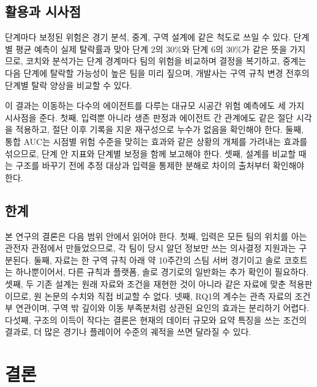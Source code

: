 \subsection{활용과 시사점}
\label{sec:discussion:implications}

단계마다 보정된 위험은 경기 분석, 중계, 구역 설계에 같은 척도로 쓰일 수 있다.
단계별 평균 예측이 실제 탈락률과 맞아 단계 2의 30\%와 단계 6의 30\%가 같은 뜻을 가지므로, 코치와 분석가는 단계 경계마다 팀의 위험을 비교하며 결정을 복기하고, 중계는 다음 단계에 탈락할 가능성이 높은 팀을 미리 짚으며, 개발사는 구역 규칙 변경 전후의 단계별 탈락 양상을 비교할 수 있다.

이 결과는 이동하는 다수의 에이전트를 다루는 대규모 시공간 위험 예측에도 세 가지 시사점을 준다.
첫째, 입력뿐 아니라 생존 판정과 에이전트 간 관계에도 같은 절단 시각을 적용하고, 절단 이후 기록을 지운 재구성으로 누수가 없음을 확인해야 한다.
둘째, 통합 AUC는 시점별 위험 수준을 맞히는 효과와 같은 상황의 개체를 가려내는 효과를 섞으므로, 단계 안 지표와 단계별 보정을 함께 보고해야 한다.
셋째, 설계를 비교할 때는 구조를 바꾸기 전에 추정 대상과 입력을 통제한 분해로 차이의 출처부터 확인해야 한다.

\subsection{한계}
\label{sec:discussion:limitations}

본 연구의 결론은 다음 범위 안에서 읽어야 한다.
첫째, 입력은 모든 팀의 위치를 아는 관전자 관점에서 만들었으므로, 각 팀이 당시 알던 정보만 쓰는 의사결정 지원과는 구분된다.
둘째, 자료는 한 구역 규칙 아래 약 10주간의 스팀 서버 경기이고 솔로 코호트는 하나뿐이어서, 다른 규칙과 플랫폼, 솔로 경기로의 일반화는 추가 확인이 필요하다.
셋째, 두 기존 설계는 원래 자료와 조건을 재현한 것이 아니라 같은 자료에 맞춘 적용판이므로, 원 논문의 수치와 직접 비교할 수 없다.
넷째, RQ1의 계수는 관측 자료의 조건부 연관이며, 구역 밖 깊이와 이동 부족분처럼 상관된 요인의 효과는 분리하기 어렵다.
다섯째, 구조의 이득이 작다는 결론은 현재의 데이터 규모와 요약 특징을 쓰는 조건의 결과로, 더 많은 경기나 플레이어 수준의 궤적을 쓰면 달라질 수 있다.

\section{결론}
\label{sec:conclusion}

